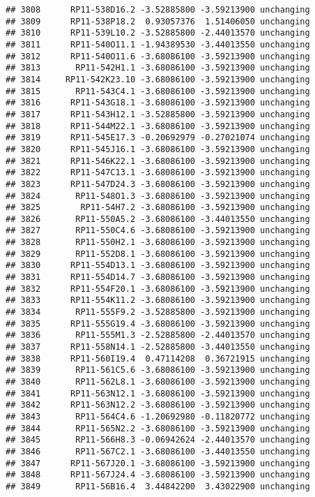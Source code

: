 \documentclass[]{article}
\begin{document}
\begin{verbatim}
## 3808      RP11-538D16.2 -3.52885800 -3.59213900 unchanging
## 3809      RP11-538P18.2  0.93057376  1.51406050 unchanging
## 3810      RP11-539L10.2 -3.52885800 -2.44013570 unchanging
## 3811      RP11-540O11.1 -1.94389530 -3.44013550 unchanging
## 3812      RP11-540O11.6 -3.68086100 -3.59213900 unchanging
## 3813       RP11-542H1.1 -3.68086100 -3.59213900 unchanging
## 3814     RP11-542K23.10 -3.68086100 -3.59213900 unchanging
## 3815       RP11-543C4.1 -3.68086100 -3.59213900 unchanging
## 3816      RP11-543G18.1 -3.68086100 -3.59213900 unchanging
## 3817      RP11-543H12.1 -3.52885800 -3.59213900 unchanging
## 3818      RP11-544M22.1 -3.68086100 -3.59213900 unchanging
## 3819      RP11-545E17.3 -0.20692979 -0.27021074 unchanging
## 3820      RP11-545J16.1 -3.68086100 -3.59213900 unchanging
## 3821      RP11-546K22.1 -3.68086100 -3.59213900 unchanging
## 3822      RP11-547C13.1 -3.68086100 -3.59213900 unchanging
## 3823      RP11-547D24.3 -3.68086100 -3.59213900 unchanging
## 3824       RP11-548O1.3 -3.68086100 -3.59213900 unchanging
## 3825        RP11-54H7.2 -3.68086100 -3.59213900 unchanging
## 3826       RP11-550A5.2 -3.68086100 -3.44013550 unchanging
## 3827       RP11-550C4.6 -3.68086100 -3.59213900 unchanging
## 3828       RP11-550H2.1 -3.68086100 -3.59213900 unchanging
## 3829       RP11-552D8.1 -3.68086100 -3.59213900 unchanging
## 3830      RP11-554D13.1 -3.68086100 -3.59213900 unchanging
## 3831      RP11-554D14.7 -3.68086100 -3.59213900 unchanging
## 3832      RP11-554F20.1 -3.68086100 -3.59213900 unchanging
## 3833      RP11-554K11.2 -3.68086100 -3.59213900 unchanging
## 3834       RP11-555F9.2 -3.52885800 -3.59213900 unchanging
## 3835      RP11-555G19.4 -3.68086100 -3.59213900 unchanging
## 3836       RP11-555M1.3 -2.52885800 -2.44013570 unchanging
## 3837      RP11-558N14.1 -2.52885800 -3.44013550 unchanging
## 3838      RP11-560I19.4  0.47114208  0.36721915 unchanging
## 3839       RP11-561C5.6 -3.68086100 -3.59213900 unchanging
## 3840       RP11-562L8.1 -3.68086100 -3.59213900 unchanging
## 3841      RP11-563N12.1 -3.68086100 -3.59213900 unchanging
## 3842      RP11-563N12.2 -3.68086100 -3.59213900 unchanging
## 3843       RP11-564C4.6 -1.20692980 -0.11820772 unchanging
## 3844       RP11-565N2.2 -3.68086100 -3.59213900 unchanging
## 3845       RP11-566H8.3 -0.06942624 -2.44013570 unchanging
## 3846       RP11-567C2.1 -3.68086100 -3.44013550 unchanging
## 3847      RP11-567J20.1 -3.68086100 -3.59213900 unchanging
## 3848      RP11-567J24.4 -3.68086100 -3.59213900 unchanging
## 3849       RP11-56B16.4  3.44842200  3.43022900 unchanging

\end{verbatim}
\end{document}
